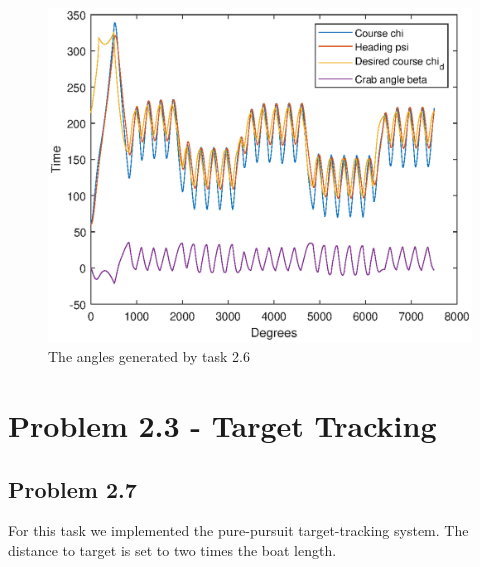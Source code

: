 \begin{figure}[ht]
	\centering
	\includegraphics[width=\textwidth]{angles2_6}
	\caption{The angles generated by task 2.6}
	\label{fig:angles2_6}
\end{figure}

\section*{Problem 2.3 - Target Tracking}
\subsection*{Problem 2.7}
For this task we implemented the pure-pursuit target-tracking system. The distance to target is set to two times the boat length. 

